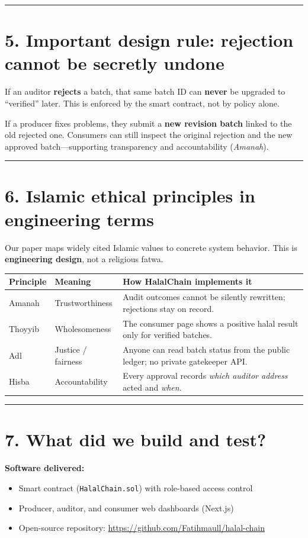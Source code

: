\documentclass[11pt,a4paper]{article}
\newcommand{\sectionline}{\vspace{0.3em}\noindent\rule{\textwidth}{0.6pt}\vspace{0.6em}}
\begin{document}
\sectionline

\section*{5. Important design rule: rejection cannot be secretly undone}

If an auditor \textbf{rejects} a batch, that same batch ID can \textbf{never} be upgraded to ``verified'' later. This is enforced by the smart contract, not by policy alone.

If a producer fixes problems, they submit a \textbf{new revision batch} linked to the old rejected one. Consumers can still inspect the original rejection and the new approved batch---supporting transparency and accountability (\emph{Amanah}).

\sectionline

\section*{6. Islamic ethical principles in engineering terms}

Our paper maps widely cited Islamic values to concrete system behavior. This is \textbf{engineering design}, not a religious fatwa.

\begin{tabularx}{\textwidth}{@{}>{\raggedright\arraybackslash}p{2.3cm}>{\raggedright\arraybackslash}p{3.2cm}X@{}}
\toprule
\textbf{Principle} & \textbf{Meaning} & \textbf{How HalalChain implements it} \\
\midrule
Amanah & Trustworthiness & Audit outcomes cannot be silently rewritten; rejections stay on record. \\
Thoyyib & Wholesomeness & The consumer page shows a positive halal result only for verified batches. \\
Adl & Justice / fairness & Anyone can read batch status from the public ledger; no private gatekeeper API. \\
Hisba & Accountability & Every approval records \emph{which auditor address} acted and \emph{when}. \\
\bottomrule
\end{tabularx}

\sectionline

\section*{7. What did we build and test?}

\textbf{Software delivered:}
\begin{itemize}[leftmargin=1.4em, itemsep=0.2em]
  \item Smart contract (\texttt{HalalChain.sol}) with role-based access control
  \item Producer, auditor, and consumer web dashboards (Next.js)
  \item Open-source repository: \url{https://github.com/Fatihmaull/halal-chain}
\end{itemize}
\end{document}
